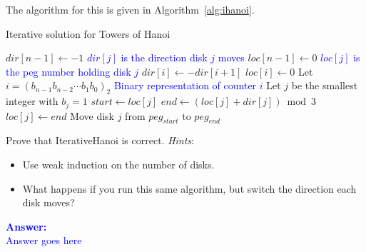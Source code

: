 The algorithm for this is given in Algorithm~\ref{alg:ihanoi}.

\begin{algorithm}[H]
  \vskip6pt

  \caption{Iterative solution for Towers of Hanoi}\label{alg:ihanoi}
  \begin{algorithmic}[1]
    \Statex
      \State $dir[n-1]\gets-1$
      \Comment\textcolor{blue}{$dir[j]$ is the direction disk $j$ moves}
      \State $loc[n-1]\gets0$
      \Comment\textcolor{blue}{$loc[j]$ is the peg number holding disk $j$}
        \State $dir[i]\gets-dir[i+1]$
        \State $loc[i]\gets0$
      \EndFor
      \Statex
        \State Let $i=(b_{n-1}b_{n-2}\cdots b_1b_0)_2$
        \Comment\textcolor{blue}{Binary representation of counter $i$}
        \State Let $j$ be the smallest integer with $b_j=1$
        \Statex
        \State $start\gets loc[j]$
        \State $end\gets (loc[j]+dir[j])\bmod3$
        \State $loc[j]\gets end$
        \Statex
        \State Move disk $j$ from $peg_{start}$ to $peg_{end}$
      \EndFor
    \EndProcedure
  \end{algorithmic}
\end{algorithm}
\newpage
Prove that {\sc IterativeHanoi} is correct.\parend
\emph{Hints}\/:
\begin{itemize}
  \item Use weak induction on the number of disks.
  \item What happens if you run this same algorithm, but switch the direction
    each disk moves?
\end{itemize}
\ifanswers
\textcolor{blue}{
\textbf{Answer:}\\[6pt]
Answer goes here
}
\newpage
\fi
